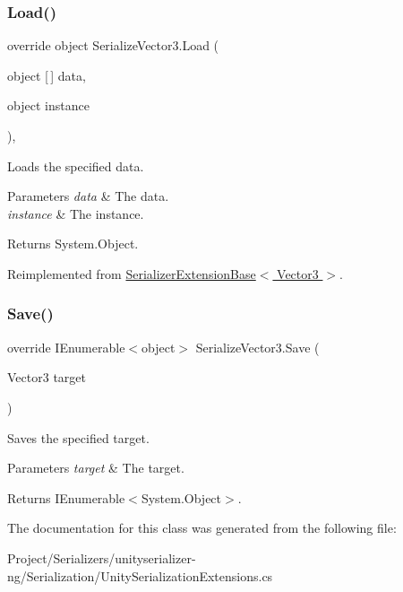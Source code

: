 \subsubsection{\texorpdfstring{Load()}{Load()}}
{\footnotesize\ttfamily override object Serialize\+Vector3.\+Load (\begin{DoxyParamCaption}\item[{object \mbox{[}$\,$\mbox{]}}]{data,  }\item[{object}]{instance }\end{DoxyParamCaption})\hspace{0.3cm}{\ttfamily [inline]}, {\ttfamily [virtual]}}



Loads the specified data. 


\begin{DoxyParams}{Parameters}
{\em data} & The data.\\
\hline
{\em instance} & The instance.\\
\hline
\end{DoxyParams}
\begin{DoxyReturn}{Returns}
System.\+Object.
\end{DoxyReturn}


Reimplemented from \hyperlink{class_serializer_extension_base_a3792a9b27056e30ca0ac91531936ae47}{Serializer\+Extension\+Base$<$ Vector3 $>$}.

\mbox{\label{class_serialize_vector3_a005d95ae45a7c705f995c23c95efecdc}} 
\subsubsection{\texorpdfstring{Save()}{Save()}}
{\footnotesize\ttfamily override I\+Enumerable$<$object$>$ Serialize\+Vector3.\+Save (\begin{DoxyParamCaption}\item[{Vector3}]{target }\end{DoxyParamCaption})\hspace{0.3cm}{\ttfamily [inline]}}



Saves the specified target. 


\begin{DoxyParams}{Parameters}
{\em target} & The target.\\
\hline
\end{DoxyParams}
\begin{DoxyReturn}{Returns}
I\+Enumerable$<$System.\+Object$>$.
\end{DoxyReturn}


The documentation for this class was generated from the following file\+:\begin{DoxyCompactItemize}
\item 
Project/\+Serializers/unityserializer-\/ng/\+Serialization/Unity\+Serialization\+Extensions.\+cs\end{DoxyCompactItemize}
